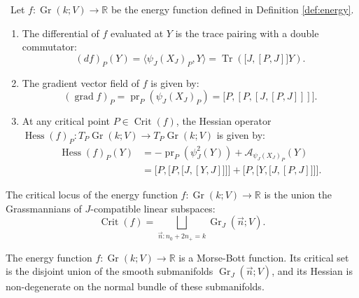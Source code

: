 \documentclass[10pt,a4paper]{amsart}
\def\A{\mathcal{A}}
\def\Crit{\operatorname{Crit}}
\def\Gr{\operatorname{Gr}}
\def\Hess{\operatorname{Hess}}
\def\R{\mathbb{R}}
\def\Tr{\operatorname{Tr}}
\def\grad{\operatorname{grad}}
\def\pr{\operatorname{pr}}
\begin{document}
\begin{lemma}\label{lem:derivatives} \
Let $f: \Gr(k; V) \to \R$ be the energy function defined in Definition \ref{def:energy}.
\begin{enumerate}
    \item The differential of $f$ evaluated at $Y$ is the trace pairing with a double commutator:
    \[ (df)_P(Y) = \langle \psi_J(X_J)_P, Y\rangle =   \Tr\left( \big[ J, [P, J]\big] Y \right). \]
    \item The gradient vector field of $f$ is given by:
    \[ (\grad f)_P = \pr_P (\psi_J(X_J)_P) = \big[ P, [P, [J, [P, J]]] \big]. \]
    \item At any critical point $P \in \Crit(f)$, the Hessian operator $\Hess(f)_P:T_P\Gr(k; V) 
    \to T_P\Gr(k; V)$ is given by:
    \begin{align*}\Hess(f)_P(Y) &= -\pr_P (\psi_J^2(Y)) + \A_{\psi_J(X_J)_P}(Y) \\&= \bigg[P, \big[P, \big [J, [Y, J]\big]\big]\bigg] + \bigg[P, \big[Y, \big[J, [P, J]\big] \big] \bigg].\end{align*}
\end{enumerate}
\end{lemma}

\begin{proposition} \label{prop:critical_locus}
The critical locus of the energy function $f: \Gr(k; V) \to \R$ is  the union the Grassmannians of $J$-compatible linear subspaces:
\[ \Crit(f) = \bigsqcup_{\vec{n}: n_0 + 2n_+ = k} \Gr_J(\vec{n}; V).\]
\end{proposition}

\begin{theorem}\label{thm:morse_bott}
The energy function $f: \Gr(k; V) \to \R$ is a Morse-Bott function. Its critical set is the disjoint union of the smooth submanifolds $\Gr_J(\vec{n}; V)$, and its Hessian is non-degenerate on the normal bundle of these submanifolds.
\end{theorem}
\end{document}
